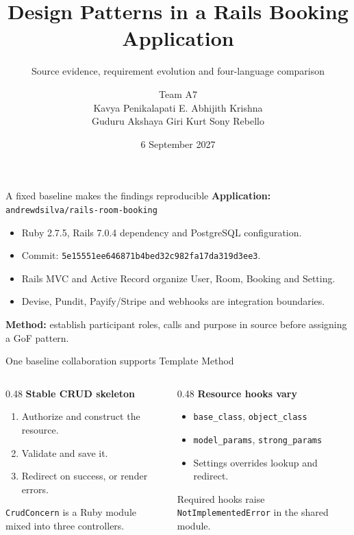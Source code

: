\documentclass[aspectratio=169,11pt]{beamer}
\title{Design Patterns in a Rails Booking Application}
\subtitle{Source evidence, requirement evolution and four-language comparison}
\author{Team A7\\\small Kavya Penikalapati \quad E. Abhijith Krishna\\\small Guduru Akshaya Giri \quad Kurt Sony Rebello}
\institute{23CSE455 -- B.Tech Artificial Intelligence \& Data Science}
\date{6 September 2027}
\begin{document}
\begin{frame}\titlepage\end{frame}
\begin{frame}{A fixed baseline makes the findings reproducible}
\textbf{Application:} \texttt{andrewdsilva/rails-room-booking}
\begin{itemize}
\item Ruby 2.7.5, Rails 7.0.4 dependency and PostgreSQL configuration.
\item Commit: {\scriptsize\texttt{5e15551ee646871b4bed32c982fa17da319d3ee3}}.
\item Rails MVC and Active Record organize User, Room, Booking and Setting.
\item Devise, Pundit, Payify/Stripe and webhooks are integration boundaries.
\end{itemize}
\vspace{0.3cm}
\textbf{Method:} establish participant roles, calls and purpose in source before assigning a GoF pattern.
\end{frame}
\begin{frame}{One baseline collaboration supports Template Method}
\begin{columns}[T]
\begin{column}{0.48\textwidth}
\textbf{Stable CRUD skeleton}
\begin{enumerate}
\item Authorize and construct the resource.
\item Validate and save it.
\item Redirect on success, or render errors.
\end{enumerate}
\texttt{CrudConcern} is a Ruby module mixed into three controllers.
\end{column}
\begin{column}{0.48\textwidth}
\textbf{Resource hooks vary}
\begin{itemize}
\item \texttt{base\_class}, \texttt{object\_class}
\item \texttt{model\_params}, \texttt{strong\_params}
\item Settings overrides lookup and redirect.
\end{itemize}
Required hooks raise \texttt{NotImplementedError} in the shared module.
\end{column}
\end{columns}
\end{frame}
\end{document}
